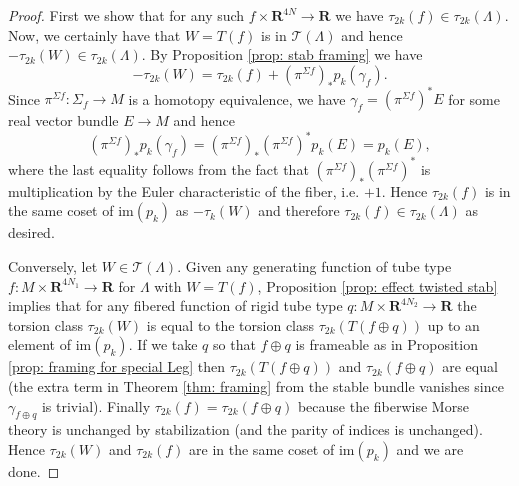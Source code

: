 \documentclass{amsart}
\newcommand\cT{\mathcal{T}}
\def\bR{\mathbf{R}}
\newtheorem{lemma}[theorem]{Lemma}
\theoremstyle{definition}
\theoremstyle{remark}
\newtheorem{inductive lemma}[theorem]{Inductive Lemma}
\begin{document}
\begin{proof}
First we show that for any such $f \times \bR^{4N} \to \bR$ we have $\tau_{2k}(f) \in \tau_{2k}(\Lambda)$. Now, we certainly have that $W=T(f)$ is in $\cT(\Lambda)$ and hence $-\tau_{2k}(W) \in \tau_{2k}(\Lambda)$. By Proposition \ref{prop: stab framing} we have
$$ -\tau_{2k}(W) =\tau_{2k}(f) + (\pi^{\Sigma f})_*p_k(\gamma_f). $$
Since $\pi^{\Sigma f}: \Sigma_f \to M$ is a homotopy equivalence, we have $\gamma_f=(\pi^{\Sigma f})^*E$ for some real vector bundle $E \to M$ and hence
$$ (\pi^{\Sigma f})_*p_k(\gamma_f) = (\pi^{\Sigma f})_*(\pi^{\Sigma f})^*p_k(E)=p_k(E), $$
where the last equality follows from the fact that $(\pi^{\Sigma f})_*(\pi^{\Sigma f})^*$ is multiplication by the Euler characteristic of the fiber, i.e. $+1$. Hence $\tau_{2k}(f)$ is in the same coset of $\text{im}(p_k)$ as $-\tau_k(W)$ and therefore $\tau_{2k}(f) \in \tau_{2k}(\Lambda)$ as desired.

Conversely, let $W \in \cT(\Lambda)$. Given any generating function of tube type $f:M \times \bR^{4N_1} \to \bR$ for $\Lambda$ with $W=T(f)$, Proposition \ref{prop: effect twisted stab} implies that for any fibered function of rigid tube type $q:M \times \bR^{4N_2} \to \bR$ the torsion class $\tau_{2k}(W)$ is equal to the torsion class $\tau_{2k}(T(f \oplus q))$  up to an element of $\text{im}(p_k)$. If we take $q$ so that $f \oplus q$ is frameable as in Proposition \ref{prop: framing for special Leg} then $\tau_{2k}(T(f \oplus q))$ and $\tau_{2k}(f \oplus q)$ are equal (the extra term in Theorem \ref{thm: framing} from the stable bundle vanishes since $\gamma_{f \oplus q}$ is trivial). Finally $\tau_{2k}(f)=\tau_{2k}( f \oplus q)$ because the fiberwise Morse theory is unchanged by stabilization (and the parity of indices is unchanged). Hence $\tau_{2k}(W)$ and $\tau_{2k}(f)$ are in the same coset of $\text{im}(p_k)$ and we are done. %
\end{proof}




\end{document}
